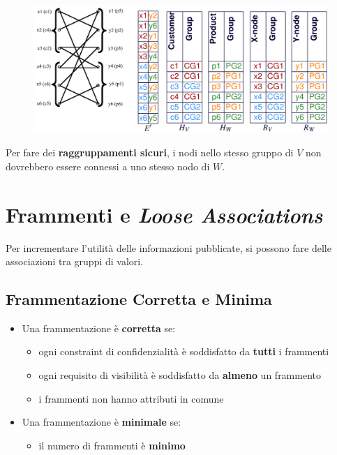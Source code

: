 \documentclass{report}
\begin{document}
\begin{figure}[ht]
    \centering
    \includegraphics[width=0.99\linewidth]{images/publ-obf-ass/k-l2.png}
\end{figure}

Per fare dei \textbf{raggruppamenti sicuri}, i nodi nello stesso gruppo di $V$ 
non dovrebbero essere connessi a uno stesso nodo di $W$.

\section{Frammenti e \textit{Loose Associations}}
Per incrementare l'utilità delle informazioni pubblicate, 
si possono fare delle associazioni tra gruppi di valori.

\subsection{Frammentazione Corretta e Minima}
\begin{itemize}
    \item Una frammentazione è \textbf{corretta} se:
    \begin{itemize}
        \item ogni constraint di confidenzialità è soddisfatto da \textbf{tutti} i frammenti 
        \item ogni requisito di visibilità è soddisfatto da \textbf{almeno} un frammento
        \item i frammenti non hanno attributi in comune
    \end{itemize}
    \item Una frammentazione è \textbf{minimale} se:
    \begin{itemize}
        \item il numero di frammenti è \textbf{minimo}
    \end{itemize}
\end{itemize}
\end{document}

